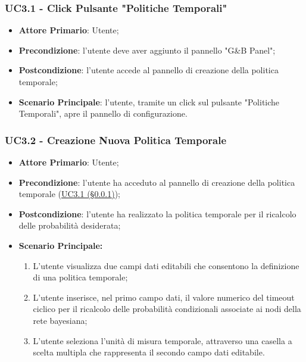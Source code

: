 \subsubsection{UC3.1 - Click Pulsante "Politiche Temporali"}\label{UC3.1}
\begin{itemize}
	\item \textbf{Attore Primario}: Utente; 
	\item \textbf{Precondizione}: l'utente deve aver aggiunto il pannello "G\&B Panel";
	\item \textbf{Postcondizione}: l'utente accede al pannello di creazione della politica temporale;
	\item \textbf{Scenario Principale}: l'utente, tramite un click sul pulsante "Politiche Temporali", apre il pannello di configurazione. 
\end{itemize}

\subsubsection{UC3.2 - Creazione Nuova Politica Temporale}\label{UC3.2}

\begin{itemize}
	\item \textbf{Attore Primario}: Utente; 
	\item \textbf{Precondizione}: l'utente ha acceduto al pannello di creazione della politica temporale (\hyperref[UC3.1]{UC3.1 (§\ref*{UC3.1})});
	\item \textbf{Postcondizione}: l'utente ha realizzato la politica temporale per il ricalcolo delle probabilità desiderata;
	\item \textbf{Scenario Principale:}
	\begin{enumerate}
		\item L'utente visualizza due campi dati editabili che consentono la definizione di una politica temporale;
		\item L'utente inserisce, nel primo campo dati, il valore numerico del timeout ciclico per il ricalcolo delle probabilità condizionali associate ai nodi della rete bayesiana; 
		\item L'utente seleziona l'unità di misura temporale, attraverso una casella a scelta multipla che rappresenta il secondo campo dati editabile.
	\end{enumerate}
	
\end{itemize}

